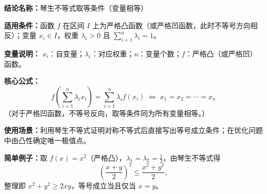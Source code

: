 \textbf{结论名称：}琴生不等式取等条件（变量相等）

\textbf{适用条件：}函数 \(f\) 在区间 \(I\) 上为严格凸函数（或严格凹函数，此时不等号方向相反）；变量 \(x_i\in I\)，权重 \(\lambda_i>0\) 且 \(\sum_{i=1}^n \lambda_i = 1\)。

\textbf{变量说明：} \(x_i\)：自变量；\(\lambda_i\)：对应权重；\(n\)：变量个数；\(f\)：严格凸（或严格凹）函数。

\textbf{核心公式：}
\[
\boxed{ f\!\left(\sum_{i=1}^{n}\lambda_i x_i\right) = \sum_{i=1}^{n}\lambda_i f(x_i) \;\Longleftrightarrow\; x_1 = x_2 = \cdots = x_n }
\]
（对于严格凹函数，不等号反向，取等条件同为所有变量相等。）

\textbf{使用场景：}利用琴生不等式证明对称不等式后直接写出等号成立条件；在优化问题中由凸性确定唯一极值点。

\textbf{简单例子：}取 \(f(x)=x^2\)（严格凸），\(\lambda_1=\lambda_2=\frac12\)，由琴生不等式得
\[
\left(\frac{x+y}{2}\right)^2 \le \frac{x^2+y^2}{2},
\]
整理即 \(x^2+y^2 \ge 2xy\)，等号成立当且仅当 \(x=y\)。